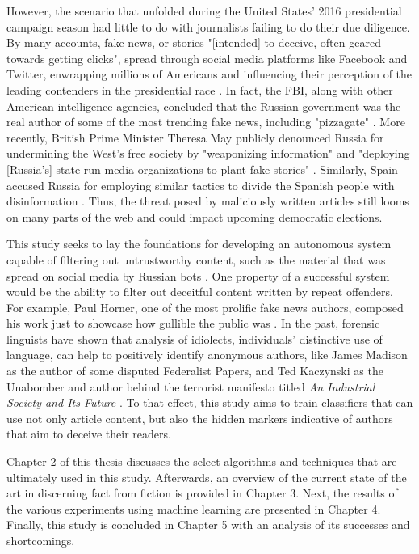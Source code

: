However, the scenario that unfolded during the United States' 2016 presidential campaign season had little to do with journalists failing to do their due diligence.  By many accounts, fake news, or stories "[intended] to deceive, often geared towards getting clicks", spread through social media platforms like Facebook and Twitter, enwrapping millions of Americans and influencing their perception of the leading contenders in the presidential race \cite{fakeNewsDef}.  In fact, the FBI, along with other American intelligence agencies, concluded that the Russian government was the real author of some of the most trending fake news, including "pizzagate" \cite{newsweekSputnik}.  More recently, British Prime Minister Theresa May publicly denounced Russia for undermining the West's free society by "weaponizing information" and "deploying [Russia's] state-run media organizations to plant fake stories" \cite{englandFakeNews}.  Similarly, Spain accused Russia for employing similar tactics to divide the Spanish people with disinformation \cite{cataloniaFakeNews}.  Thus, the threat posed by maliciously written articles still looms on many parts of the web and could impact upcoming democratic elections.

This study seeks to lay the foundations for developing an autonomous system capable of filtering out untrustworthy content, such as the material that was spread on social media by Russian bots \cite{russianBots}.  One property of a successful system would be the ability to filter out deceitful content written by repeat offenders.  For example, Paul Horner, one of the most prolific fake news authors, composed his work just to showcase how gullible the public was \cite{fakeNewsAuthor}.  In the past, forensic linguists have shown that analysis of idiolects, individuals' distinctive use of language, can help to positively identify anonymous authors, like James Madison as the author of some disputed Federalist Papers, and Ted Kaczynski as the Unabomber and author behind the terrorist manifesto titled \textit{An Industrial Society and Its Future} \cite{federalistPapers, forensicLinguistics}.  To that effect, this study aims to train classifiers that can use not only article content, but also the hidden markers indicative of authors that aim to deceive their readers.

Chapter 2 of this thesis discusses the select algorithms and techniques that are ultimately used in this study.  Afterwards, an overview of the current state of the art in discerning fact from fiction is provided in Chapter 3.  Next, the results of the various experiments using machine learning are presented in Chapter 4.  Finally, this study is concluded in Chapter 5 with an analysis of its successes and shortcomings.

